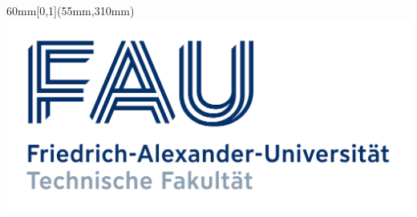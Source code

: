 \documentclass[12pt,a4paper]{article}
\begin{document}
\begin{titlepage}
  
      

    \begin{textblock*}{60mm}[0,1](55mm,310mm)
      \includegraphics[scale=0.17]{FAU_Logo.png}
    \end{textblock*}

  \end{titlepage}
\end{document}
